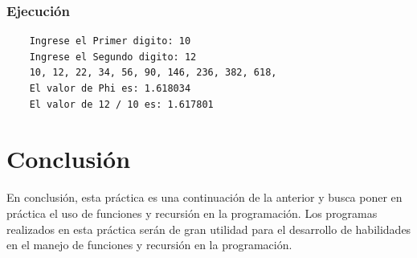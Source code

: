 \documentclass{article}
\begin{document}
	\subsubsection{Ejecución}
	
	\begin{lstlisting}
	Ingrese el Primer digito: 10
	Ingrese el Segundo digito: 12
	10, 12, 22, 34, 56, 90, 146, 236, 382, 618, 
	El valor de Phi es: 1.618034
	El valor de 12 / 10 es: 1.617801 
	\end{lstlisting}
	
	\newpage
	\section{Conclusión}
	
	En conclusión, esta práctica es una continuación de la anterior y busca poner en práctica el uso de funciones y recursión en la programación. Los programas realizados en esta práctica serán de gran utilidad para el desarrollo de habilidades en el manejo de funciones y recursión en la programación.
	
\end{document}
